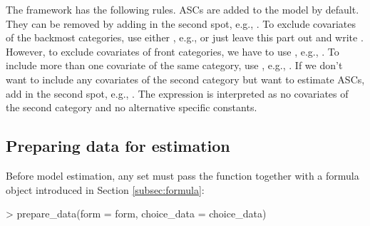 \documentclass[article,shortnames]{jss}
\newcommand{\fct}[1]{\code{#1()}}
\begin{document}
The framework has the following rules. ASCs are added to the model by default. They can be removed by adding  in the second spot, e.g., . To exclude covariates of the backmost categories, use either , e.g.,  or just leave this part out and write . However, to exclude covariates of front categories, we have to use , e.g., . To include more than one covariate of the same category, use \code{+}, e.g., . If we don't want to include any covariates of the second category but want to estimate ASCs, add  in the second spot, e.g., . The expression  is interpreted as no covariates of the second category and no alternative specific constants.

\subsection{Preparing data for estimation} \label{subsec:prepare_data}

Before model estimation, any  set must pass the \fct{prepare\_data} function together with a formula object  introduced in Section \ref{subsec:formula}:

\begin{Schunk}
\begin{Sinput}
> prepare_data(form = form, choice_data = choice_data)
\end{Sinput}
\end{Schunk}
\end{document}
